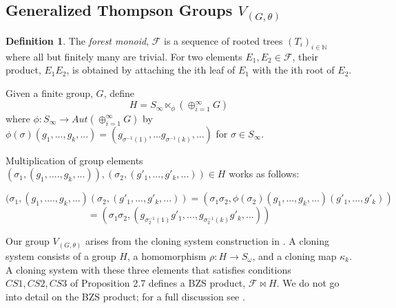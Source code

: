 \documentclass[11pt]{amsart}
\theoremstyle{plain}
\theoremstyle{remark}
\theoremstyle{definition}
\newtheorem{definition}[theorem]{Definition}
\theoremstyle{remark}
\theoremstyle{named}
\begin{document}
\begin{figure}[ht]
\end{figure}
\subsection{Generalized Thompson Groups $V_{(G, \theta)}$}
\begin{definition}
\cite{Witza} The \emph{forest monoid}, $\mathcal{F}$ is a sequence of rooted trees $(T_i)_{i\in \mathbb{N}}$ where all but finitely many are trivial. For two elements $E_1, E_2 \in \mathcal{F}$, their product,  $E_1E_2$, is obtained by attaching the ith leaf of $E_1$ with the ith root of $E_2$.

\end{definition}

Given a finite group, $G$, define
\[H = S_{\infty} \ltimes_\phi (\oplus^{\infty}_{i=1} G)\]
where $\phi: S_{\infty} \to Aut(\oplus^{\infty}_{i=1} G)$ by $\phi(\sigma)(g_1, ... , g_k, ...)=(g_{\sigma^{-1}(1)}, ... g_{\sigma^{-1}(k)}, ...)$ for $\sigma \in S_{\infty}$. 

Multiplication of group elements $(\sigma_1, (g_1, .... , g_k, ...)), (\sigma_2,(g'_1, ... , g'_k, ...)) \in H$ works as follows:

\[(\sigma_1, (g_1, .... , g_k, ...)(\sigma_2,(g'_1, ... , g'_k, ...))=(\sigma_1 \sigma_2, \phi(\sigma_2)(g_1, ... , g_k, ...)(g'_1, ... , g'_k))\]
\[= (\sigma_1 \sigma_2, (g_{\sigma_2^{-1}(1)}g'_1, ... , g_{\sigma_2^{-1}(k)}g'_k, ...))\]

Our group $V_{(G,\theta)}$ arises from the cloning system construction in \cite{Witza}. A cloning system consists of a group $H$, a homomorphism $\rho:H \to S_\omega$, and a cloning map $\kappa_k$. A cloning system with these three elements that satisfies conditions $CS1, CS2, CS3$ of Proposition 2.7 \cite{Witza} defines a BZS product, $\mathcal{F} \bowtie H$. We do not go into detail on the BZS product; for a full discussion see \cite{Witza}.
\end{document}
